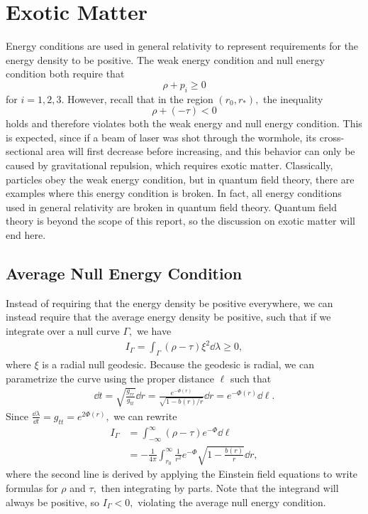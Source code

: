 \documentclass[%
 reprint,
 amsmath,amssymb
 aps,
]{revtex4}
\theoremstyle{remark}
\begin{document}
\section{Exotic Matter}
Energy conditions are used in general relativity to represent requirements for the energy density to be positive. The weak energy condition and null energy condition both require that\cite{Wald}
\begin{equation}
    \rho + p_i \ge 0
\end{equation}
for $i=1,2,3.$ However, recall that in the region $(r_0,r_*),$ the inequality
\begin{equation}
    \rho + (-\tau) < 0
\end{equation}
holds and therefore violates both the weak energy and null energy condition. This is expected, since if a beam of laser was shot through the wormhole, its cross-sectional area will first decrease before increasing, and this behavior can only be caused by gravitational repulsion, which requires exotic matter\cite{Thorne}. Classically, particles obey the weak energy condition, but in quantum field theory, there are examples where this energy condition is broken. In fact, all energy conditions used in general relativity are broken in quantum field theory\cite{Lobo}. Quantum field theory is beyond the scope of this report, so the discussion on exotic matter will end here.
\subsection{Average Null Energy Condition}
Instead of requiring that the energy density be positive everywhere, we can instead require that the average energy density be positive, such that if we integrate over a null curve $\Gamma,$ we have 
\begin{align}
    I_{\Gamma} = \int_{\Gamma} (\rho - \tau) \xi^2 \dd{\lambda} \ge 0,
\end{align}
where $\xi$ is a radial null geodesic. Because the geodesic is radial, we can parametrize the curve using the proper distance $\ell$ such that 
\begin{align}
    \dd{t} = \sqrt{\frac{g_{rr}}{g_{tt}}}\dd{r} = \frac{e^{-\Phi(r)}}{\sqrt{1-b(r)/r}}\dd{r} = e^{-\Phi(r)}\dd{\ell}.
\end{align}
Since $\frac{\dd{\lambda}}{\dd{t}} = g_{tt} = e^{2\Phi(r)},$ we can rewrite 
\begin{align}
    I_{\Gamma} &= \int_{-\infty}^{\infty} (\rho - \tau)e^{-\Phi}\dd{\ell} \\ 
    &= -\frac{1}{4\pi}\int_{r_0}^{\infty}\frac{1}{r^2}e^{-\Phi}\sqrt{1 - \frac{b(r)}{r}}\dd{r},
\end{align}
where the second line is derived by applying the Einstein field equations to write formulas for $\rho$ and $\tau,$ then integrating by parts\cite{Visser}. Note that the integrand will always be positive, so $I_{\Gamma} < 0,$ violating the average null energy condition.
\vspace{2mm}
\end{document}
